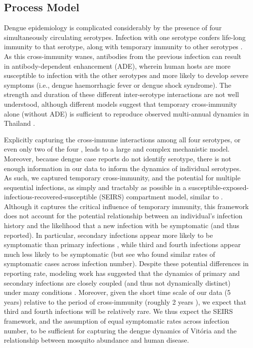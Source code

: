\documentclass[10pt,letterpaper]{article}
\begin{document}
\subsection*{Process Model}

Dengue epidemiology is complicated considerably by the presence of four simultaneously circulating serotypes.
Infection with one serotype confers life-long immunity to that serotype, along with temporary immunity to other serotypes \cite{Wearing2006}.  
As this cross-immunity wanes, antibodies from the previous infection can result in antibody-dependent enhancement (ADE), wherein human hosts are more susceptible to infection with the other serotypes and more likely to develop severe symptoms (i.e., dengue haemorrhagic fever or dengue shock syndrome)\cite{Wearing2006}.
The strength and duration of these different inter-serotype interactions are not well understood, although different models suggest that temporary cross-immunity alone (without ADE) is sufficient to reproduce observed multi-annual dynamics in Thailand \cite{Wearing2006,Reich2013}.

Explicitly capturing the cross-immune interactions among all four serotypes, or even only two of the four \cite{Aguiar2013}, leads to a large and complex mechanistic model.
Moreover, because dengue case reports do not identify serotype, there is not enough information in our data to inform the dynamics of individual serotypes.
As such, we captured temporary cross-immunity, and the potential for multiple sequential infections, as simply and tractably as possible in a susceptible-exposed-infectious-recovered-susceptible (SEIRS) compartment model, similar to \cite{Newton1992, Burattini2008, Pinho2010, Hooten2010}.
Although it captures the critical influence of temporary immunity, this framework does not account for the potential relationship between an individual's infection history and the likelihood that a new infection with be symptomatic (and thus reported).
In particular, secondary infections appear more likely to be symptomatic than primary infections \cite{Imai2016,Clapham2017}, while third and fourth infections appear much less likely to be symptomatic \cite{Olkowski2013} (but see \cite{Montoya2013} who found similar rates of symptomatic cases across infection number).
Despite these potential differences in reporting rate, modeling work has suggested that the dynamics of primary and secondary infections are closely coupled (and thus not dynamically distinct) under many conditions \cite{Schwartz2005}.
Moreover, given the short time scale of our data (5 years) relative to the period of cross-immunity (roughly 2 years \cite{Reich2013}), we expect that third and fourth infections will be relatively rare.
We thus expect the SEIRS framework, and the assumption of equal symptomatic rates across infection number, to be sufficient for capturing the dengue dynamics of Vit\'oria and the relationship between mosquito abundance and human disease.
\end{document}
